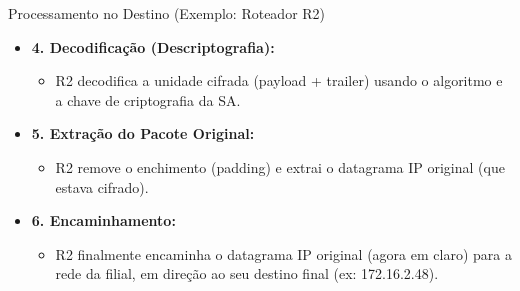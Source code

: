 \begin{frame}{Processamento no Destino (Exemplo: Roteador R2)}
    \begin{itemize}
        \item \textbf{4. Decodificação (Descriptografia):}
              \begin{itemize}
                  \item R2 decodifica a unidade cifrada (payload + trailer) usando o algoritmo e a chave de criptografia da SA.
              \end{itemize}

        \item \textbf{5. Extração do Pacote Original:}
              \begin{itemize}
                  \item R2 remove o enchimento (padding) e extrai o datagrama IP original (que estava cifrado).
              \end{itemize}

        \item \textbf{6. Encaminhamento:}
              \begin{itemize}
                  \item R2 finalmente encaminha o datagrama IP original (agora em claro) para a rede da filial, em direção ao seu destino final (ex: 172.16.2.48).
              \end{itemize}
    \end{itemize}
\end{frame}

